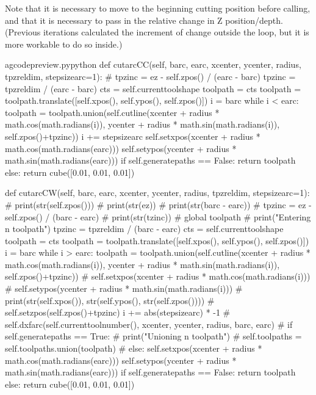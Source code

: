 \documentclass{ltxdoc}
\begin{document}

Note that it is necessary to move to the beginning cutting position before calling, and that it is necessary to pass in the relative change in Z position/depth. (Previous iterations calculated the increment of change outside the loop, but it is more workable to do so inside.)

\lstset{firstnumber=\thegcpy}
\begin{writecode}{a}{gcodepreview.py}{python}
    def cutarcCC(self, barc, earc, xcenter, ycenter, radius, tpzreldim, stepsizearc=1):
#        tpzinc = ez - self.zpos() / (earc - barc)
        tpzinc = tpzreldim / (earc - barc)
        cts = self.currenttoolshape
        toolpath = cts
        toolpath = toolpath.translate([self.xpos(), self.ypos(), self.zpos()])
        i = barc
        while i < earc: 
            toolpath = toolpath.union(self.cutline(xcenter + radius * math.cos(math.radians(i)), ycenter + radius * math.sin(math.radians(i)), self.zpos()+tpzinc))
            i += stepsizearc
        self.setxpos(xcenter + radius * math.cos(math.radians(earc)))
        self.setypos(ycenter + radius * math.sin(math.radians(earc)))
        if self.generatepaths == False:
            return toolpath
        else:
            return cube([0.01, 0.01, 0.01])

    def cutarcCW(self, barc, earc, xcenter, ycenter, radius, tpzreldim, stepsizearc=1):
#        print(str(self.zpos()))
#        print(str(ez))
#        print(str(barc - earc))
#        tpzinc = ez - self.zpos() / (barc - earc)
#        print(str(tzinc))
#        global toolpath
#        print("Entering n toolpath")
        tpzinc = tpzreldim / (barc - earc)
        cts = self.currenttoolshape
        toolpath = cts
        toolpath = toolpath.translate([self.xpos(), self.ypos(), self.zpos()])
        i = barc
        while i > earc: 
            toolpath = toolpath.union(self.cutline(xcenter + radius * math.cos(math.radians(i)), ycenter + radius * math.sin(math.radians(i)), self.zpos()+tpzinc))
#            self.setxpos(xcenter + radius * math.cos(math.radians(i)))
#            self.setypos(ycenter + radius * math.sin(math.radians(i)))
#            print(str(self.xpos()), str(self.ypos(), str(self.zpos())))
#            self.setzpos(self.zpos()+tpzinc)
            i += abs(stepsizearc) * -1
#        self.dxfarc(self.currenttoolnumber(), xcenter, ycenter, radius, barc, earc)
#        if self.generatepaths == True:
#            print("Unioning n toolpath")
#            self.toolpaths = self.toolpaths.union(toolpath)
#        else:
        self.setxpos(xcenter + radius * math.cos(math.radians(earc)))
        self.setypos(ycenter + radius * math.sin(math.radians(earc)))
        if self.generatepaths == False:
            return toolpath
        else:
            return cube([0.01, 0.01, 0.01])

\end{writecode}
\addtocounter{gcpy}{45}
\end{document}

